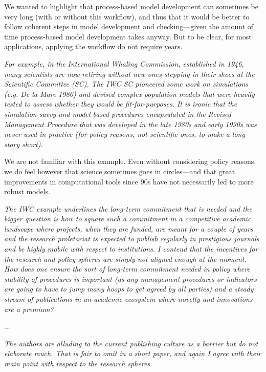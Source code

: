 \documentclass[11pt,letter]{article}
\begin{document}
We wanted to highlight that process-based model development can sometimes be very long (with or without this workflow), and thus that it would be better to follow coherent steps in model development and checking---given the amount of time process-based model development takes anyway. But to be clear, for most applications, applying the workflow do not require years.

\begin{mybox}
\emph{For example, in the International Whaling Commission, established in
1946, many scientists are now retiring without new ones stepping in their shoes at the Scientific
Committee (SC). The IWC SC pioneered some work on simulations (e.g. De la Mare 1986) and
devised complex population models that were heavily tested to assess whether they would be
fit-for-purposes. It is ironic that the simulation-savvy and model-based procedures
encapsulated in the Revised Management Procedure that was developed in the late 1980s and
early 1990s was never used in practice (for policy reasons, not scientific ones, to make a long
story short).}  
\end{mybox}

We are not familiar with this example. Even without considering policy reasons, we do feel however that science sometimes goes in circles---and that great improvements in computational tools since 90s have not necessarily led to more robust models. 

\begin{mybox}
\emph{The IWC example underlines the long-term commitment that is needed and the bigger
question is how to square such a commitment in a competitive academic landscape where
projects, when they are funded, are meant for a couple of years and the research proletariat is
expected to publish regularly in prestigious journals and be highly mobile with respect to
institutions. I contend that the incentives for the research and policy spheres are simply not
aligned enough at the moment. How does one ensure the sort of long-term commitment
needed in policy where stability of procedures is important (as any management procedures or
indicators are going to have to jump many hoops to get agreed by all parties) and a steady
stream of publications in an academic ecosystem where novelty and innovations are a
premium?}  
\end{mybox}

...

\begin{mybox}
\emph{The authors are alluding to the current publishing culture as a barrier but do not elaborate
much. That is fair to omit in a short paper, and again I agree with their main point with respect to the research spheres.}
\end{mybox}
\end{document}
